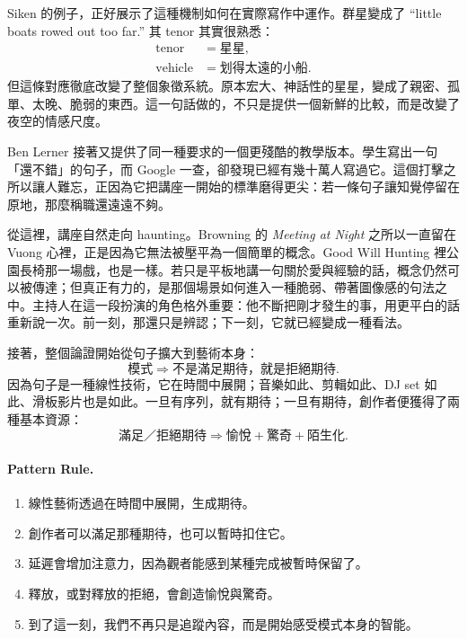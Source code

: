 Siken 的例子，正好展示了這種機制如何在實際寫作中運作。群星變成了 ``little boats rowed out too far.'' 其 tenor 其實很熟悉：
\begin{align}
\text{tenor} &= \text{星星},\\
\text{vehicle} &= \text{划得太遠的小船}.
\end{align}
但這條對應徹底改變了整個象徵系統。原本宏大、神話性的星星，變成了親密、孤單、太晚、脆弱的東西。這一句話做的，不只是提供一個新鮮的比較，而是改變了夜空的情感尺度。

Ben Lerner 接著又提供了同一種要求的一個更殘酷的教學版本。學生寫出一句「還不錯」的句子，而 Google 一查，卻發現已經有幾十萬人寫過它。這個打擊之所以讓人難忘，正因為它把講座一開始的標準磨得更尖：若一條句子讓知覺停留在原地，那麼稱職還遠遠不夠。

從這裡，講座自然走向 haunting。Browning 的 \textit{Meeting at Night} 之所以一直留在 Vuong 心裡，正是因為它無法被壓平為一個簡單的概念。Good Will Hunting 裡公園長椅那一場戲，也是一樣。若只是平板地講一句關於愛與經驗的話，概念仍然可以被傳達；但真正有力的，是那個場景如何進入一種脆弱、帶著圖像感的句法之中。主持人在這一段扮演的角色格外重要：他不斷把剛才發生的事，用更平白的話重新說一次。前一刻，那還只是辨認；下一刻，它就已經變成一種看法。

接著，整個論證開始從句子擴大到藝術本身：
\begin{equation}
\text{模式} \Longrightarrow \text{不是滿足期待，就是拒絕期待}.
\end{equation}
因為句子是一種線性技術，它在時間中展開；音樂如此、剪輯如此、DJ set 如此、滑板影片也是如此。一旦有序列，就有期待；一旦有期待，創作者便獲得了兩種基本資源：
\begin{equation}
\text{滿足／拒絕期待} \Longrightarrow \text{愉悅} + \text{驚奇} + \text{陌生化}.
\end{equation}

\paragraph{Pattern Rule.}
\begin{enumerate}
\item 線性藝術透過在時間中展開，生成期待。
\item 創作者可以滿足那種期待，也可以暫時扣住它。
\item 延遲會增加注意力，因為觀者能感到某種完成被暫時保留了。
\item 釋放，或對釋放的拒絕，會創造愉悅與驚奇。
\item 到了這一刻，我們不再只是追蹤內容，而是開始感受模式本身的智能。
\end{enumerate}

